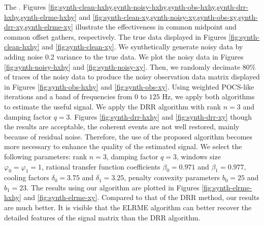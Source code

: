 The . Figures \ref{fig:synth-clean-hxhy,synth-noisy-hxhy,synth-obs-hxhy,synth-drr-hxhy,synth-elrme-hxhy} and \ref{fig:synth-clean-xy,synth-noisy-xy,synth-obs-xy,synth-drr-xy,synth-elrme-xy} illustrate the effectiveness in common midpoint and common offset gathers, respectively. The true data  displayed in Figures \ref{fig:synth-clean-hxhy} and \ref{fig:synth-clean-xy}. We synthetically generate noisy data by adding  noise  0.2 variance to the true data. We plot the noisy data in Figures \ref{fig:synth-noisy-hxhy} and \ref{fig:synth-noisy-xy}. Then, we randomly decimate $80\%$ of traces of the noisy data to produce the noisy observation data matrix displayed in Figures \ref{fig:synth-obs-hxhy} and \ref{fig:synth-obs-xy}. Using  weighted POCS-like iterations and a band of frequencies  from $0$ to $125$ Hz, we apply both algorithms to estimate the useful signal. We apply the DRR algorithm with rank ${n}=3$ and damping factor ${q}=3$. Figures \ref{fig:synth-drr-hxhy} and \ref{fig:synth-drr-xy}  though the results are acceptable, the coherent events are not well restored, mainly because of residual noise. Therefore, the use of the proposed algorithm becomes more necessary to enhance the quality of the estimated signal. We select the following parameters: rank ${n}=3$, damping factor ${q}=3$, windows size ${\varphi_0=\varphi_1}=1$, rational transfer function coefficients ${\beta_0}=0.971$ and ${\beta_1}=0.977$, cooling factors $\delta_0 = 3.75$ and $\delta_1 = 3.25$, penalty convexity parameters ${b_0}=25$ and ${b_1}=23$. The results using our algorithm are plotted in Figures \ref{fig:synth-elrme-hxhy} and \ref{fig:synth-elrme-xy}. Compared to that of the DRR method, our results are much better. It is visible that the ELRME algorithm can better recover the detailed features of the signal matrix than the DRR algorithm.


